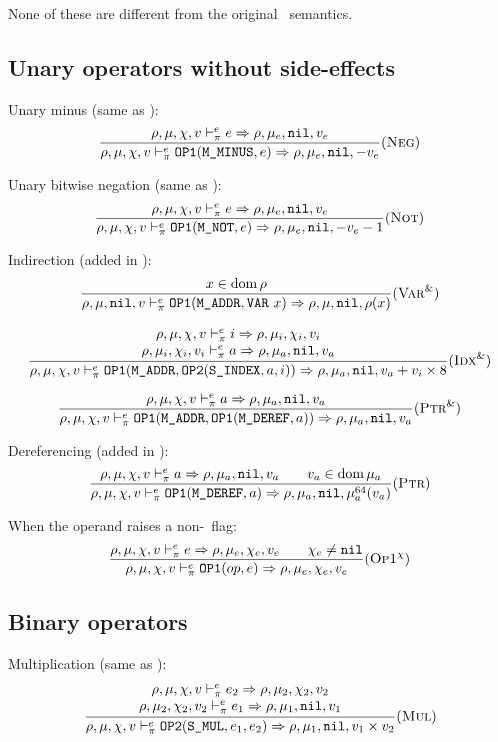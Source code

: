 None of these are different from the original \Cmm\ semantics.

\subsection{Unary operators without side-effects}
Unary minus (same as \Cmm):
\[\dfrac{
    \rho,\mu,\chi,v \vdash_\pi^e e \Rightarrow \rho,\mu_e,\texttt{nil},v_e
}{\rho,\mu,\chi,v \vdash_\pi^e \texttt{OP1}(\texttt{M\_MINUS}, e) \Rightarrow \rho,\mu_e,\texttt{nil},-v_e}(\textsc{Neg})\]

Unary bitwise negation (same as \Cmm):
\[\dfrac{
    \rho,\mu,\chi,v \vdash_\pi^e e\Rightarrow \rho,\mu_e,\texttt{nil},v_e
}{\rho,\mu,\chi,v \vdash_\pi^e \texttt{OP1}(\texttt{M\_NOT}, e) \Rightarrow \rho,\mu_e,\texttt{nil},-v_e-1}(\textsc{Not})\]


Indirection (added in \Cmp):
\[\dfrac{
    x\in\operatorname{dom}\rho
}{\rho,\mu,\texttt{nil},v \vdash_\pi^e \texttt{OP1}(\texttt{M\_ADDR}, \texttt{VAR}\ x)\Rightarrow \rho,\mu,\texttt{nil},\rho(x)}(\textsc{Var}^\&)\]

\[\dfrac{\begin{array}{c}
    \rho,\mu,\chi,v \vdash_\pi^e i\Rightarrow \rho,\mu_i,\chi_i,v_i \\
    \rho,\mu_i,\chi_i,v_i \vdash_\pi^e a\Rightarrow \rho,\mu_a,\texttt{nil},v_a \\
\end{array}}{\rho,\mu,\chi,v \vdash_\pi^e \texttt{OP1}(\texttt{M\_ADDR}, \texttt{OP2}(\texttt{S\_INDEX}, a, i)) \Rightarrow \rho,\mu_a,\texttt{nil},v_a+v_i\times 8}(\textsc{Idx}^\&)\]

\[\dfrac{
    \rho,\mu,\chi,v \vdash_\pi^e a \Rightarrow \rho,\mu_a,\texttt{nil},v_a
}{\rho,\mu,\chi,v \vdash_\pi^e \texttt{OP1}(\texttt{M\_ADDR}, \texttt{OP1}(\texttt{M\_DEREF}, a)) \Rightarrow \rho,\mu_a,\texttt{nil},v_a}(\textsc{Ptr}^\&)\]

Dereferencing (added in \Cmp):
\[\dfrac{
    \rho,\mu,\chi,v \vdash_\pi^e a\Rightarrow \rho,\mu_a,\texttt{nil},v_a \qquad v_a\in\operatorname{dom}\mu_a
}{\rho,\mu,\chi,v \vdash_\pi^e \texttt{OP1}(\texttt{M\_DEREF}, a) \Rightarrow \rho,\mu_a,\texttt{nil},\mu_a^{64}(v_a)}(\textsc{Ptr})\]

When the operand raises a non-\nil\ flag:
\[\dfrac{
    \rho,\mu,\chi,v \vdash_\pi^e e\Rightarrow \rho,\mu_e,\chi_e,v_e \qquad \chi_e\ne\texttt{nil}
}{\rho,\mu,\chi,v \vdash_\pi^e \texttt{OP1}(op, e) \Rightarrow \rho,\mu_e,\chi_e,v_e}(\textsc{Op1}^\chi)\]

\subsection{Binary operators}
Multiplication (same as \Cmm):
\[\dfrac{\begin{array}{c}
    \rho,\mu,\chi,v \vdash_\pi^e e_2\Rightarrow \rho,\mu_2,\chi_2,v_2 \\
    \rho,\mu_2,\chi_2,v_2 \vdash_\pi^e e_1\Rightarrow \rho,\mu_1,\texttt{nil},v_1
\end{array}}{\rho,\mu,\chi,v \vdash_\pi^e \texttt{OP2}(\texttt{S\_MUL}, e_1, e_2) \Rightarrow \rho,\mu_1,\texttt{nil},v_1\times v_2}(\textsc{Mul})\]

